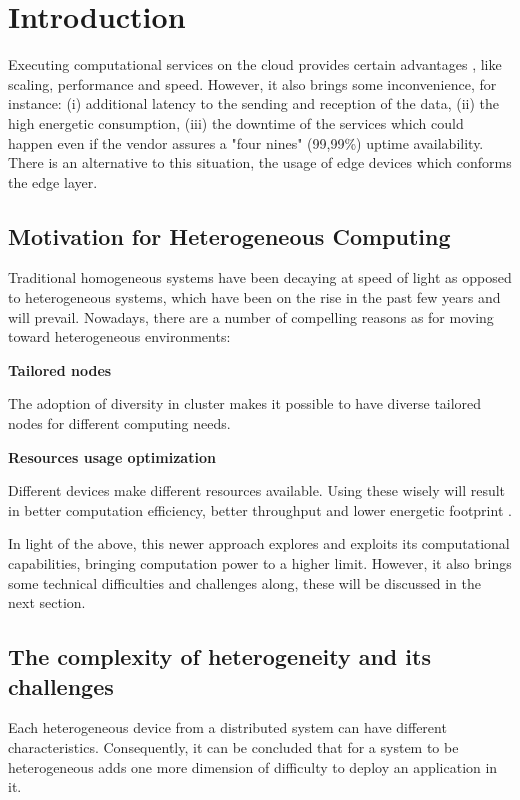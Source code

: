 \section{Introduction}
    Executing computational services on the cloud provides certain advantages \cite{microsoft_corporation_what_nodate}, like scaling, performance and speed. However, it also brings some inconvenience, for instance: (i) additional latency to the sending and reception of the data, (ii) the high energetic consumption, (iii) the downtime of the services which could happen even if the vendor assures a "four nines" (99,99\%) uptime availability. There is an alternative to this situation, the usage of edge devices which conforms the edge layer.
        
    \subsection{Motivation for Heterogeneous Computing}
        Traditional homogeneous systems have been decaying at speed of light as opposed to heterogeneous systems, which have been on the rise in the past few years and will prevail. Nowadays, there are a number of compelling reasons as for moving toward heterogeneous environments:
        
        \textbf{Tailored nodes}
        
        The adoption of diversity in cluster makes it possible to have diverse tailored nodes for different computing needs.
        
        \textbf{Resources usage optimization}
        
        Different devices make different resources available. Using these wisely will result in better computation efficiency, better throughput and lower energetic footprint \cite{mittal_survey_2015}.
        
        In light of the above, this newer approach explores and exploits its computational capabilities, bringing computation power to a higher limit. However, it also brings some technical difficulties and challenges along, these will be discussed in the next section.

    \subsection{The complexity of heterogeneity and its challenges}
        Each heterogeneous device from a distributed system can have different characteristics. Consequently, it can be concluded that for a system to be heterogeneous adds one more dimension of difficulty to deploy an application in it.
    
